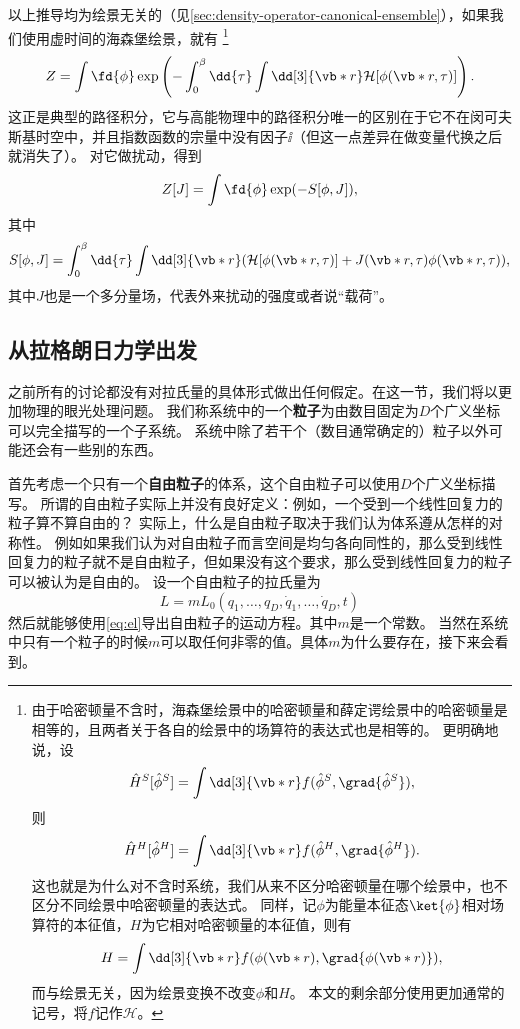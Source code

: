 以上推导均为绘景无关的（见\autoref{sec:density-operator-canonical-ensemble}），如果我们使用虚时间的海森堡绘景，就有%
\footnote{由于哈密顿量不含时，海森堡绘景中的哈密顿量和薛定谔绘景中的哈密顿量是相等的，且两者关于各自的绘景中的场算符的表达式也是相等的。
更明确地说，设
\[
    \hat{H}^S[\hat{\phi}^S] = \int \dd[3]{\vb*{r}} f(\hat{\phi}^S, \grad{\hat{\phi}^S}),
\]
则
\[
    \hat{H}^H[\hat{\phi}^H] = \int \dd[3]{\vb*{r}} f(\hat{\phi}^H, \grad{\hat{\phi}^H}).
\]
这也就是为什么对不含时系统，我们从来不区分哈密顿量在哪个绘景中，也不区分不同绘景中哈密顿量的表达式。
同样，记$\phi$为能量本征态$\ket{\phi}$相对场算符的本征值，$H$为它相对哈密顿量的本征值，则有
\[
    H = \int \dd[3]{\vb*{r}} f(\phi(\vb*{r}), \grad{\phi(\vb*{r})}),
\]
而与绘景无关，因为绘景变换不改变$\phi$和$H$。
本文的剩余部分使用更加通常的记号，将$f$记作$\mathcal{H}$。
}%
\[
    Z = \int \fd{\phi} \exp \left( - \int_0^\beta \dd{\tau} \int \dd[3]{\vb*{r}} \mathcal{H}[\phi(\vb*{r}, \tau)] \right). 
\]
这正是典型的路径积分，它与高能物理中的路径积分唯一的区别在于它不在闵可夫斯基时空中，并且指数函数的宗量中没有因子$\ii$（但这一点差异在做变量代换之后就消失了）。
对它做扰动，得到
\begin{equation}
    Z[J] = \int \fd{\phi} \exp ( - S[\phi, J] ),
\end{equation}
其中
\begin{equation}
    S[\phi, J] = \int_0^\beta \dd{\tau} \int \dd[3]{\vb*{r}} (\mathcal{H}[\phi(\vb*{r}, \tau)] + J(\vb*{r}, \tau) \phi(\vb*{r}, \tau)),
\end{equation}
其中$J$也是一个多分量场，代表外来扰动的强度或者说“载荷”。


\subsection{从拉格朗日力学出发}

之前所有的讨论都没有对拉氏量的具体形式做出任何假定。在这一节，我们将以更加物理的眼光处理问题。
我们称系统中的一个\textbf{粒子}为由数目固定为$D$个广义坐标可以完全描写的一个子系统。
系统中除了若干个（数目通常确定的）粒子以外可能还会有一些别的东西。

首先考虑一个只有一个\textbf{自由粒子}的体系，这个自由粒子可以使用$D$个广义坐标描写。
所谓的自由粒子实际上并没有良好定义：例如，一个受到一个线性回复力的粒子算不算自由的？
实际上，什么是自由粒子取决于我们认为体系遵从怎样的对称性。
例如如果我们认为对自由粒子而言空间是均匀各向同性的，那么受到线性回复力的粒子就不是自由粒子，但如果没有这个要求，那么受到线性回复力的粒子可以被认为是自由的。
设一个自由粒子的拉氏量为
\begin{equation}
    L = m L_0(q_1, \ldots, q_D, \dot{q}_1, \ldots, \dot{q}_D, t)
    \label{eq:single-particle}
\end{equation}
然后就能够使用\eqref{eq:el}导出自由粒子的运动方程。其中$m$是一个常数。
当然在系统中只有一个粒子的时候$m$可以取任何非零的值。具体$m$为什么要存在，接下来会看到。


